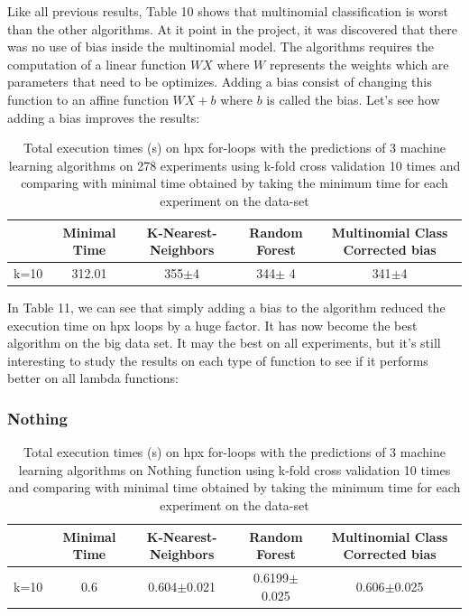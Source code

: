 Like all previous results, Table 10 shows that multinomial classification is worst than the other algorithms. At it point in the project, it was discovered that there was no use of bias inside the multinomial model. The algorithms requires the computation of a linear function $W X$ where $W$ represents the weights which are parameters that need to be optimizes. Adding a bias consist of changing this function to an affine function $WX+b$ where $b$ is called the bias. Let's see how adding a bias improves the results:

\begin{table}[h]
	\centering
	\caption{Total execution times (s) on hpx for-loops with the predictions of 3 machine learning algorithms on 278 experiments using k-fold cross validation 10 times and comparing with minimal time obtained by taking the minimum time for each experiment on the data-set}
	\label{my-label}
	\begin{tabular}{|c|c|c|c|c|}
		\hline
		& Minimal Time&K-Nearest-Neighbors & Random Forest &Multinomial Class Corrected bias\\ \hline
		k=10  &312.01&
		355$\pm$4        & 344$\pm$ 4&341$\pm$4 \\ \hline
	\end{tabular}
\end{table}
In Table 11, we can see that simply adding a bias to the algorithm reduced the execution time on hpx loops by a huge factor. It has now become the best algorithm on the big data set. It may the best on all experiments, but it's still interesting to study the results on each type of function to see if it performs better on all lambda functions:
\newpage
\subsubsection{Nothing}

\begin{table}[h]
	\centering
	\caption{Total execution times (s) on hpx for-loops with the predictions of 3 machine learning algorithms on Nothing function using k-fold cross validation 10 times and comparing with minimal time obtained by taking the minimum time for each experiment on the data-set}
	\label{my-label}
	\begin{tabular}{|c|c|c|c|c|}
		\hline
		& Minimal Time&K-Nearest-Neighbors & Random Forest &Multinomial Class Corrected bias\\ \hline
		k=10  &0.6&
		0.604$\pm$0.021       & 0.6199$\pm$0.025&0.606$\pm$0.025 \\ \hline
	\end{tabular}
\end{table}

